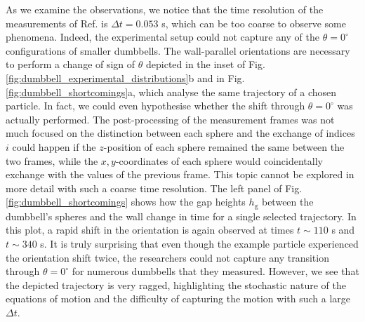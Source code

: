 \documentclass{master_thesis}
\begin{document}
As we examine the observations, we notice that the time resolution of the measurements of Ref. \cite{verweij2021} is $\Delta t = 0.053$ s, which can be too coarse to observe some phenomena. Indeed, the experimental setup could not capture any of the $\theta=0^{\circ}$ configurations of smaller dumbbells. The wall-parallel orientations are necessary to perform a change of sign of $\theta$ depicted in the inset of Fig. \ref{fig:dumbbell_experimental_distributions}b and in Fig. \ref{fig:dumbbell_shortcomings}a, which analyse the same trajectory of a chosen particle. In fact, we could even hypothesise whether the shift through $\theta=0^{\circ}$ was actually performed. The post-processing of the measurement frames was not much focused on the distinction between each sphere and the exchange of indices $i$ could happen if the $z$-position of each sphere remained the same between the two frames, while the $x,y$-coordinates of each sphere would coincidentally exchange with the values of the previous frame. This topic cannot be explored in more detail with such a coarse time resolution. The left panel of Fig. \ref{fig:dumbbell_shortcomings} shows how the gap heights $h_{\textrm{g}}$ between the dumbbell's spheres and the wall change in time for a single selected trajectory. In this plot, a rapid shift in the orientation is again observed at times $t \sim 110$ s and $t\sim 340$ s. It is truly surprising that even though the example particle experienced the orientation shift twice, the researchers could not capture any transition through $\theta=0^{\circ}$ for numerous dumbbells that they measured. However, we see that the depicted trajectory is very ragged, highlighting the stochastic nature of the equations of motion and the difficulty of capturing the motion with such a large $\Delta t$.
\end{document}
